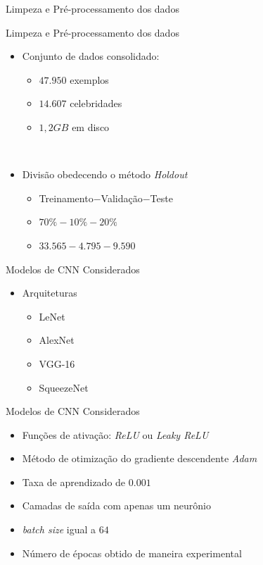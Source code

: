 \begin{frame}{Limpeza e Pré-processamento dos dados}
\begin{itemize}
\begin{figure}[!ht]
\begin{subfigure}[h]{0.4\linewidth}
          	\end{subfigure}
          \end{figure}
     \end{itemize}
\end{frame}

\begin{frame}{Limpeza e Pré-processamento dos dados}
     \begin{itemize}
          \item Conjunto de dados consolidado:
          \begin{itemize}
               \item $47.950$ exemplos
               \item $14.607$ celebridades
               \item $1,2 GB$ em disco
          \end{itemize}
          \ \ \newline
          \item Divisão obedecendo o método \emph{Holdout}
          \begin{itemize}
               \item Treinamento$-$Validação$-$Teste
               \item $70\%-10\%-20\%$
               \item $33.565-4.795-9.590$
          \end{itemize}
     \end{itemize}
\end{frame}

\begin{frame}{Modelos de CNN Considerados}
     \begin{itemize}
          \item Arquiteturas
          \begin{itemize}
            \item LeNet
            \item AlexNet
            \item VGG-16
            \item SqueezeNet
          \end{itemize}
     \end{itemize}
\end{frame}

\begin{frame}{Modelos de CNN Considerados}
     \begin{itemize}
          \item Funções de ativação: \emph{ReLU} ou \emph{Leaky ReLU}
          \item Método de otimização do gradiente descendente \emph{Adam}
          \item Taxa de aprendizado de $0.001$
          \ \ \newline
          \item Camadas de saída com apenas um neurônio
          \item \emph{batch size} igual a $64$
          \item Número de épocas obtido de maneira experimental
     \end{itemize}
\end{frame}
